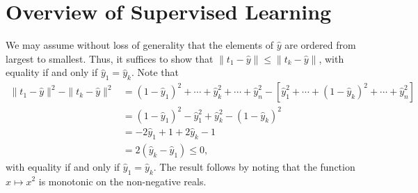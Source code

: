 \chapter{Overview of Supervised Learning}

\begin{ex}
  We may assume without loss of generality that the elements of $\hat{y}$ are
  ordered from largest to smallest. Thus, it suffices to show that
  $\|t_1-\hat{y}\|\leq \|t_k-\hat{y}\|$, with equality if and only
  if $\hat{y}_1=\hat{y}_k$. Note that
  \begin{align*}
    \|t_1-\hat{y}\|^2-\|t_k-\hat{y}\|^2
     & =(1-\hat{y}_1)^2+\cdots+\hat{y}_k^2+\cdots+\hat{y}_n^2
    -\left[\hat{y}_1^2+\cdots+(1-\hat{y}_k)^2+\cdots+\hat{y}_n^2\right] \\
     & =(1-\hat{y}_1)^2-\hat{y}_1^2+\hat{y}_k^2-(1-\hat{y}_k)^2         \\
     & =-2\hat{y}_1 + 1+2\hat{y}_k -1                                   \\
     & =2(\hat{y}_k - \hat{y}_1)
    \leq 0,
  \end{align*}
  with equality if and only if $\hat{y}_1=\hat{y}_k$. The result follows
  by noting that the function $x\mapsto x^2$ is monotonic on the non-negative
  reals.
\end{ex}

\begin{ex}
\end{ex}

\begin{ex}
\end{ex}

\begin{ex}
\end{ex}

\begin{ex}
\end{ex}

\begin{ex}
\end{ex}

\begin{ex}
\end{ex}

\begin{ex}
\end{ex}

\begin{ex}
\end{ex}